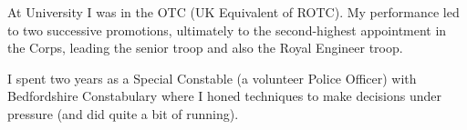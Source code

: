 

\vspace{.25cm}
\begin{cvitems}\bodyfont\small
	\item At University I was in the OTC (UK Equivalent of ROTC). My performance led to two successive promotions, ultimately to the second-highest appointment in the Corps, leading the senior troop and also the Royal Engineer troop.\vspace{.2cm}
	\item I spent two years as a Special Constable (a volunteer Police Officer) with Bedfordshire Constabulary where I honed techniques to make decisions under pressure (and did quite a bit of running).

\end{cvitems}